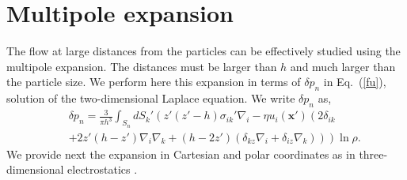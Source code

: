 \section{Multipole expansion}


The flow at large distances from the particles can be  effectively studied using the multipole expansion. The distances must be larger than $h$ and much larger than the particle size.
We perform here this expansion in terms of $\delta p_n$ in Eq.~(\ref{fu}), solution of the two-dimensional
Laplace equation. We write $\delta p_n$ as,
\begin{eqnarray}&&\!\!\!\!\!\!\!\!\!
\delta p_n=\frac{3}{\pi h^3}\int_{S_n}dS_k' \left(
z'(z'-h) \sigma_{ik}'\nabla_i-\eta u_{i}(\bm x')\left(
2\delta_{ik}\nonumber\right.\right.\\&&\!\!\!\!\!\!\!\!\!\left.\left.+2z'(h\!-\!z')\nabla_i \nabla_k
+(h\!-\!2z')
\left(\delta_{kz}\nabla_i+\delta_{iz}\nabla_k \right)\right)\right)\ln \rho.\label{deltap}
\end{eqnarray}
We provide next the expansion 
in Cartesian and polar coordinates  
as in three-dimensional electrostatics \cite{cl}.

